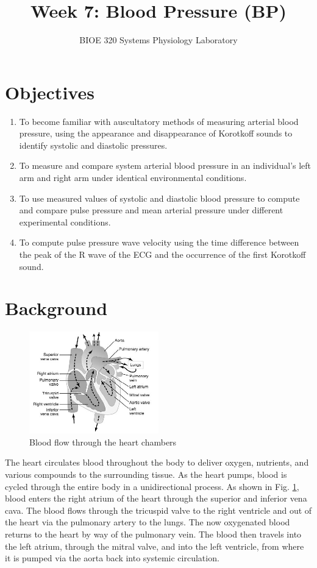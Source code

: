 \documentclass{article}
\title{Week 7: Blood Pressure (BP)}
\author{BIOE 320 Systems Physiology Laboratory}
\date{}
\begin{document}
\large
\maketitle

\section*{Objectives}
\begin{enumerate}
	\item To become familiar with auscultatory methods of measuring arterial blood pressure, using the appearance and disappearance of Korotkoff sounds to identify systolic and diastolic pressures.
	\item To measure and compare system arterial blood pressure in an individual's left arm and right arm under identical environmental conditions.
	\item To use measured values of systolic and diastolic blood pressure to compute and compare pulse pressure and mean arterial pressure under different experimental conditions.
	\item To compute pulse pressure wave velocity using the time difference between the peak of the R wave of the ECG and the occurrence of the first Korotkoff sound.
\end{enumerate}

\section*{Background}

\begin{figure}[h]
\centering\includegraphics[width=0.5\textwidth]{../images/BP_1.jpg}
\caption{Blood flow through the heart chambers}
\label{flow}
\end{figure}

The heart circulates blood throughout the body to deliver oxygen, nutrients, and various compounds to the surrounding tissue. As the heart pumps, blood is cycled through the entire body in a unidirectional process. As shown in Fig. \ref{flow}, blood enters the right atrium of the heart through the superior and inferior vena cava. The blood flows through the tricuspid valve to the right ventricle and out of the heart via the pulmonary artery to the lungs. The now oxygenated blood returns to the heart by way of the pulmonary vein. The blood then travels into the left atrium, through the mitral valve, and into the left ventricle, from where it is pumped via the aorta back into systemic circulation.\\
\end{document}
